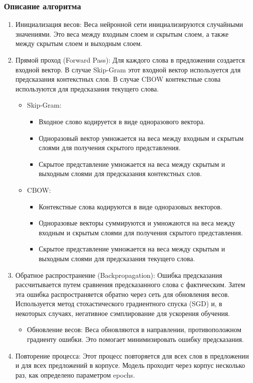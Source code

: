 		\subsubsection{Описание алгоритма}
			\begin{enumerate}
				\item Инициализация весов:
Веса нейронной сети инициализируются случайными значениями. Это веса между входным слоем и скрытым слоем, а также между скрытым слоем и выходным слоем.
				\item Прямой проход (Forward Pass):
Для каждого слова в предложении создается входной вектор. В случае Skip-Gram этот входной вектор используется для предсказания контекстных слов. В случае CBOW контекстные слова используются для предсказания текущего слова.
				\begin{itemize}
					\item Skip-Gram:
					\begin{itemize}
						\item Входное слово кодируется в виде одноразового вектора.
						\item Одноразовый вектор умножается на веса между входным и скрытым слоями для получения скрытого представления.
						\item Скрытое представление умножается на веса между скрытым и выходным слоями для предсказания контекстных слов.
					\end{itemize}
					\item CBOW:
					\begin{itemize}
						\item Контекстные слова кодируются в виде одноразовых векторов.
						\item Одноразовые векторы суммируются и умножаются на веса между входным и скрытым слоями для получения скрытого представления.
						\item Скрытое представление умножается на веса между скрытым и выходным слоями для предсказания текущего слова.
					\end{itemize}								
				\end{itemize}
				\item Обратное распространение (Backpropagation):
Ошибка предсказания рассчитывается путем сравнения предсказанного слова с фактическим. Затем эта ошибка распространяется обратно через сеть для обновления весов. Используется метод стохастического градиентного спуска (SGD) и, в некоторых случаях, негативное сэмплирование для ускорения обучения.
				\begin{itemize}
					\item Обновление весов:
Веса обновляются в направлении, противоположном градиенту ошибки. Это помогает минимизировать ошибку предсказания.
				\end{itemize}
				\item Повторение процесса:
Этот процесс повторяется для всех слов в предложении и для всех предложений в корпусе. Модель проходит через корпус несколько раз, как определено параметром epochs.
			\end{enumerate}
	
